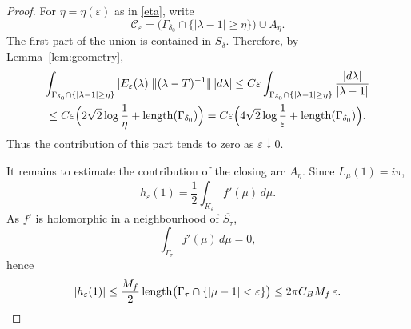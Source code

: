 \documentclass[10pt,a4paper]{amsart}
\begin{document}
\begin{proof}
For \(\eta=\eta(\varepsilon)\) as in \eqref{eta}, write
\[
   \mathcal C_\varepsilon
   =
   \bigl(\Gamma_{\delta_0}\cap\{|\lambda-1|\ge\eta\}\bigr)
   \cup A_\eta .
\]
The first part of the union is contained in \(S_\delta\).  Therefore, by Lemma~\ref{lem:geometry}, 
\begin{gather}\label{delta0}
   \int_{\Gamma_{\delta_0}\cap\{|\lambda-1|\ge\eta\}}
   |E_\varepsilon(\lambda)|
   \|(\lambda-T)^{-1}\|\,|d\lambda| 
    \le
   C\varepsilon
   \int_{\Gamma_{\delta_0}\cap\{|\lambda-1|\ge\eta\}}
   \frac{|d\lambda|}{|\lambda-1|} \\
   \le
   C\varepsilon
   \Bigl(
      2\sqrt2\log\frac1\eta
      +
      \operatorname{length}(\Gamma_{\delta_0})
   \Bigr) 
   =
   C\varepsilon
   \Bigl(
      4\sqrt2\log\frac1\varepsilon
      +
      \operatorname{length}(\Gamma_{\delta_0})
   \Bigr).\notag
\end{gather}
Thus the contribution of this part tends to zero as $\varepsilon \downarrow 0.$



It remains to estimate the contribution of the closing arc \(A_\eta\).  Since \(L_\mu(1)=i\pi\),
\[
        h_\varepsilon(1)
        =
        \frac12 
        \int_{K_\varepsilon}f'(\mu)\,d\mu .
\]
As \(f'\) is holomorphic in a neighbourhood of \(\overline{S_\tau}\),
\[
        \int_{\Gamma_\tau}f'(\mu)\,d\mu=0,
\]
hence
\[
\begin{aligned}
        |h_\varepsilon(1)|
        \le
        \frac{M_f}{2}
        \operatorname{length}
        \bigl(\Gamma_\tau\cap\{|\mu-1|<\varepsilon\}\bigr) 
        \le
        2\pi C_{\rm B}M_f\,\varepsilon.
\end{aligned}
\]



\end{proof}
\end{document}
